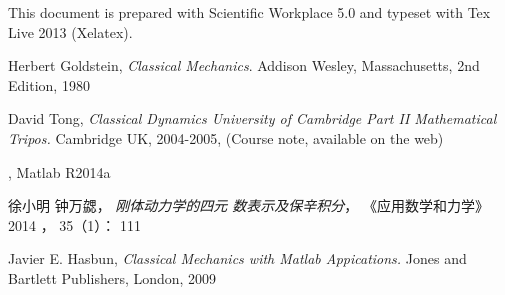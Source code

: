 \documentclass[12pt,a4paper]{article}
\begin{document}
\href{https://drive.google.com/file/d/0B96HmLH-SQVmekx0a0RoSVFzWFE/edit?usp=sharing%
}{\underline{\color{blue}}}

\href{http://tinypic.com/r/10cw9yf/8}{\underline{\color{blue}%
}}

This document is prepared with Scientific Workplace 5.0 and typeset with Tex
Live 2013 (Xelatex). \href{http://whymranderson.blogspot.tw/2014/03/how-to-convert-swp-50-special-unicode.html%
}{\underline{\color{blue}}}

\begin{thebibliography}{9}
 Herbert Goldstein, \emph{Classical Mechanics}. Addison
Wesley, Massachusetts, 2nd Edition, 1980

 David Tong, \emph{Classical Dynamics University of Cambridge
Part II Mathematical Tripos.} Cambridge UK, 2004-2005, (Course note,
available on the web)

 \href{http://www.mathworks.com/help/matlab/ordinary-differential-equations.html%
}{\underline{\color{blue}%
}}, Matlab R2014a

 徐小明 钟万勰，%
\textit{刚体动力学的四元%
数表示及保辛积分}，%
《应用数学和力学》 2014%
， 35（1）： 111

 Javier E. Hasbun, \emph{Classical Mechanics with Matlab
Appications.} Jones and Bartlett Publishers, London, 2009
\end{thebibliography}
\end{document}
